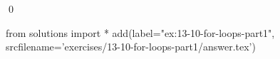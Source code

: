
\begin{ex}
  \label{ex:13-10-for-loops-part1}
  
  \qed
\end{ex}
\begin{python0}
from solutions import *
add(label="ex:13-10-for-loops-part1",
    srcfilename='exercises/13-10-for-loops-part1/answer.tex')
\end{python0}
